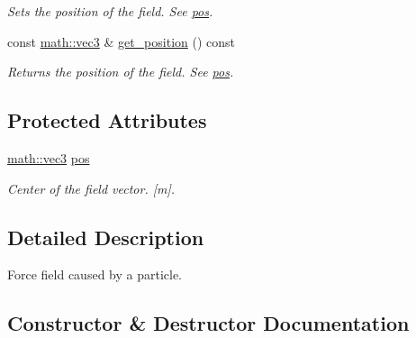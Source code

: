 \begin{DoxyCompactItemize}
\begin{DoxyCompactList}\small\item\em Sets the position of the field. See \hyperlink{classphysim_1_1fields_1_1punctual_a00344d6f3e4f3f841e7d876918c66977}{pos}. \end{DoxyCompactList}\item 
\mbox{\label{classphysim_1_1fields_1_1punctual_ac93cc5a07cf093ef1e721237b9340485}} 
const \hyperlink{structphysim_1_1math_1_1vec3}{math\+::vec3} \& \hyperlink{classphysim_1_1fields_1_1punctual_ac93cc5a07cf093ef1e721237b9340485}{get\+\_\+position} () const
\begin{DoxyCompactList}\small\item\em Returns the position of the field. See \hyperlink{classphysim_1_1fields_1_1punctual_a00344d6f3e4f3f841e7d876918c66977}{pos}. \end{DoxyCompactList}\end{DoxyCompactItemize}
\subsection*{Protected Attributes}
\begin{DoxyCompactItemize}
\item 
\mbox{\label{classphysim_1_1fields_1_1punctual_a00344d6f3e4f3f841e7d876918c66977}} 
\hyperlink{structphysim_1_1math_1_1vec3}{math\+::vec3} \hyperlink{classphysim_1_1fields_1_1punctual_a00344d6f3e4f3f841e7d876918c66977}{pos}
\begin{DoxyCompactList}\small\item\em Center of the field vector. \mbox{[}m\mbox{]}. \end{DoxyCompactList}\end{DoxyCompactItemize}


\subsection{Detailed Description}
Force field caused by a particle. 

\subsection{Constructor \& Destructor Documentation}
\mbox{\label{classphysim_1_1fields_1_1punctual_acd56bc75a1b617501190a427beefbc25}} 
